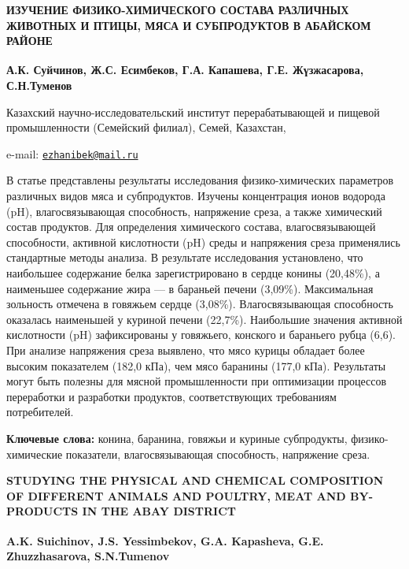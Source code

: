\begin{articleheader}
{\bfseries ИЗУЧЕНИЕ ФИЗИКО-ХИМИЧЕСКОГО СОСТАВА РАЗЛИЧНЫХ ЖИВОТНЫХ И ПТИЦЫ,
МЯСА И СУБПРОДУКТОВ В АБАЙСКОМ РАЙОНЕ}

{\bfseries
А.К. Суйчинов,
Ж.С. Есимбеков\textsuperscript{\envelope },
Г.А. Капашева,
Г.Е. Жүзжасарова,
С.Н.Туменов
}
\end{articleheader}

\begin{affiliation}
Казахский научно-исследовательский институт перерабатывающей и пищевой промышленности (Семейский филиал), Семей, Казахстан,

e-mail: \href{mailto:ezhanibek@mail.ru}{\nolinkurl{ezhanibek@mail.ru}}
\end{affiliation}

В статье представлены результаты исследования физико-химических
параметров различных видов мяса и субпродуктов. Изучены концентрация
ионов водорода (pH), влагосвязывающая способность, напряжение среза, а
также химический состав продуктов. Для определения химического состава,
влагосвязывающей способности, активной кислотности (pH) среды и
напряжения среза применялись стандартные методы анализа. В результате
исследования установлено, что наибольшее содержание белка
зарегистрировано в сердце конины (20,48\%), а наименьшее содержание жира
--- в бараньей печени (3,09\%). Максимальная зольность отмечена в
говяжьем сердце (3,08\%). Влагосвязывающая способность оказалась
наименьшей у куриной печени (22,7\%). Наибольшие значения активной
кислотности (pH) зафиксированы у говяжьего, конского и бараньего рубца
(6,6). При анализе напряжения среза выявлено, что мясо курицы обладает
более высоким показателем (182,0 кПа), чем мясо баранины (177,0 кПа).
Результаты могут быть полезны для мясной промышленности при оптимизации
процессов переработки и разработки продуктов, соответствующих
требованиям потребителей.

{\bfseries Ключевые слова:} конина, баранина, говяжьи и куриные
субпродукты, физико-химические показатели, влагосвязывающая способность,
напряжение среза.

\begin{articleheader}
{\bfseries STUDYING THE PHYSICAL AND CHEMICAL COMPOSITION OF DIFFERENT
ANIMALS AND POULTRY, MEAT AND BY-PRODUCTS IN THE ABAY DISTRICT}

{\bfseries
A.K. Suichinov,
J.S. Yessimbekov\textsuperscript{\envelope },
G.A. Kapasheva,
G.E. Zhuzzhasarova,
S.N.Tumenov
}
\end{articleheader}

